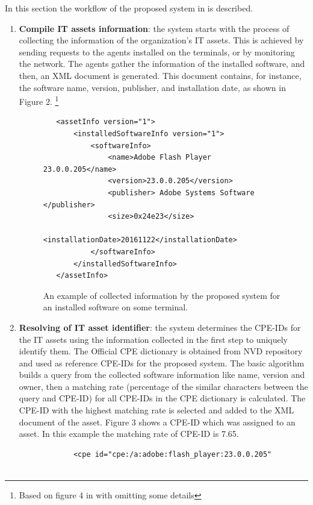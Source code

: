 \documentclass{llncs}
\begin{document}
\begin{flushleft}
In this section the workflow of the proposed system in \cite{paper1} is described.
 \end{flushleft}
\begin{enumerate}
 \item \textbf{Compile IT assets information}: the system starts with the process of collecting the information of the organization's IT assets. This is achieved by sending requests to the agents installed on the terminals, or by monitoring the network. The agents gather the information of the installed software, and then, an XML document is generated. This document contains, for instance, the software name, version, publisher, and installation date, as shown in Figure 2.  \footnote{Based on figure 4 in \cite{paper1} with omitting some details} 

 \begin{figure}
 \centering
   \lstset{language=XML}
    \begin{lstlisting}
   <assetInfo version="1">
       <installedSoftwareInfo version="1">
           <softwareInfo>
               <name>Adobe Flash Player 23.0.0.205</name>
               <version>23.0.0.205</version>
               <publisher> Adobe Systems Software </publisher>
               <size>0x24e23</size>
               <installationDate>20161122</installationDate>
           </softwareInfo>
       </installedSoftwareInfo>
   </assetInfo>
    \end{lstlisting}
   \caption{An example of collected information by the proposed system for an installed software on some terminal.}
    \end{figure}
   
   \item \textbf{Resolving of IT asset identifier}: the system determines the CPE-IDs for the IT assets using the information  collected in the first step to uniquely identify them. The Official CPE dictionary is obtained from NVD repository and used as reference CPE-IDs for the proposed system. The basic algorithm builds a query from the collected software information like name, version and owner, then a matching rate (percentage of the similar characters between the query and CPE-ID) for all CPE-IDs in the CPE dictionary is calculated.  The CPE-ID with the highest matching rate is selected and added to the XML document of the asset. Figure 3 shows a CPE-ID which was assigned to an asset. In this example the matching rate of CPE-ID is 7.65.
   
    \begin{figure}
    \centering
      \lstset{language=XML}
       \begin{lstlisting} 
       <cpe id="cpe:/a:adobe:flash_player:23.0.0.205"
       

\end{lstlisting}
\end{figure}
\end{enumerate}
\end{document}

